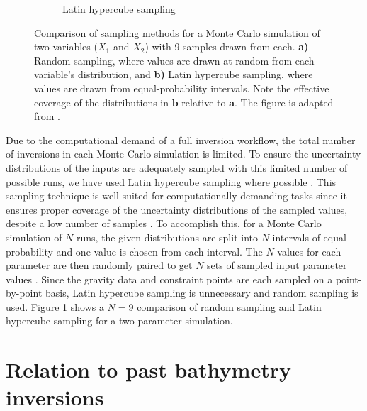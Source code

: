 \begin{figure}[!ht]
\begin{subfigure}[t]{.35\textwidth}
        \caption{Latin hypercube sampling}
    \end{subfigure}
    \caption[Random vs Latin hypercube sampling]{Comparison of sampling methods for a Monte Carlo simulation of two variables ($X_1$ and $X_2$) with 9 samples drawn from each. \textbf{a)} Random sampling, where values are drawn at random from each variable's distribution, and \textbf{b)} Latin hypercube sampling, where values are drawn from equal-probability intervals. Note the effective coverage of the distributions in \textbf{b} relative to \textbf{a}. The figure is adapted from \citet{kochautomated2017}.}
    \label{fig:chp4_latin_hypercube_sampling}
\end{figure}

Due to the computational demand of a full inversion workflow, the total number of inversions in each Monte Carlo simulation is limited. To ensure the uncertainty distributions of the inputs are adequately sampled with this limited number of possible runs, we have used Latin hypercube sampling where possible \citep{jansenmonte1994}. This sampling technique is well suited for computationally demanding tasks since it ensures proper coverage of the uncertainty distributions of the sampled values, despite a low number of samples \cite{heltonsurvey2006}. To accomplish this, for a Monte Carlo simulation of $N$ runs, the given distributions are split into $N$ intervals of equal probability and one value is chosen from each interval. The $N$ values for each parameter are then randomly paired to get $N$ sets of sampled input parameter values \citep{heltonsurvey2006}. Since the gravity data and constraint points are each sampled on a point-by-point basis, Latin hypercube sampling is unnecessary and random sampling is used. Figure \ref{fig:chp4_latin_hypercube_sampling} shows a $N=9$ comparison of random sampling and Latin hypercube sampling for a two-parameter simulation. \\


\section[Past inversions]{Relation to past bathymetry inversions} \label{chp4:past_inversions}

